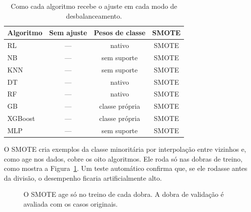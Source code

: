 \documentclass[11pt,a4paper]{article}
\begin{document}
\begin{table}[ht]
\centering
\small
\caption{Como cada algoritmo recebe o ajuste em cada modo de desbalanceamento.}
\label{tab:desb}
\begin{tabular}{@{}lccc@{}}
\toprule
Algoritmo & Sem ajuste & Pesos de classe & SMOTE \\
\midrule
RL      & --- & \cellcolor{verdeclaro}nativo & \cellcolor{laranjaclaro}SMOTE \\
NB      & --- & \cellcolor{cinzaclaro}sem suporte & \cellcolor{laranjaclaro}SMOTE \\
KNN     & --- & \cellcolor{cinzaclaro}sem suporte & \cellcolor{laranjaclaro}SMOTE \\
DT      & --- & \cellcolor{verdeclaro}nativo & \cellcolor{laranjaclaro}SMOTE \\
RF      & --- & \cellcolor{verdeclaro}nativo & \cellcolor{laranjaclaro}SMOTE \\
GB      & --- & \cellcolor{azulclaro}classe própria & \cellcolor{laranjaclaro}SMOTE \\
XGBoost & --- & \cellcolor{azulclaro}classe própria & \cellcolor{laranjaclaro}SMOTE \\
MLP     & --- & \cellcolor{cinzaclaro}sem suporte & \cellcolor{laranjaclaro}SMOTE \\
\bottomrule
\end{tabular}
\end{table}

O SMOTE cria exemplos da classe minoritária por interpolação entre vizinhos e, como age nos dados, cobre os oito algoritmos. Ele
roda só nas dobras de treino, como mostra a Figura~\ref{fig:smote}. Um teste automático confirma que, se ele rodasse
antes da divisão, o desempenho ficaria artificialmente alto.

\begin{figure}[ht]
\centering
{}
\caption{O SMOTE age só no treino de cada dobra. A dobra de validação é avaliada com os casos originais.}
\label{fig:smote}
\end{figure}
\end{document}
